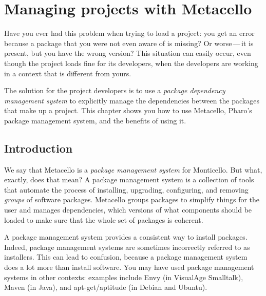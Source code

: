 \documentclass[a4paper,10pt,twoside]{book}
\begin{document}
\fi
\sloppy



\chapter{Managing projects with Metacello}
\chapterauthor{\authordale{} \\ \authormariano{}}

\noindent
Have you ever had this problem when trying to load a project: you get an error because a package that you were not even aware of is missing?  Or worse\,---\,it is present, but you have the wrong version? This situation can easily occur, even though the project loads fine for its developers, when the developers are working in a context that is different from yours.

The solution for the project developers is to use a \emph{package dependency management system} to explicitly manage the dependencies between the packages that make up a project.
This chapter shows you how to use Metacello, Pharo's package management system, and the benefits of using it.

\section{Introduction}

We say that Metacello is a \emph{package management system} for Monticello.
But what, exactly, does that mean?
A package management system is a collection of tools that automate the process of installing, upgrading, configuring, and removing \emph{groups} of software packages. Metacello groups packages to simplify things for the user and manages dependencies, \ie which versions of what components should be loaded to make sure that the whole set of packages is coherent.

A package management system provides a consistent way to install packages.
Indeed, package management systems are sometimes incorrectly referred to as installers. This can lead to confusion, because a package management system does a lot more than install software.  You may have used package management systems in other contexts: examples include Envy (in VisualAge Smalltalk), Maven (in Java), and apt-get/aptitude (in Debian and Ubuntu).
\end{document}
